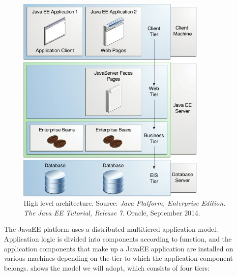 \begin{figure}%
	\centering%
	\includegraphics[width=0.83\textwidth]{img/JEETT}%
	\caption{High level architecture. Source: \emph{Java Platform, Enterprise Edition. The Java EE Tutorial, Release 7}. Oracle, September 2014.}\label{fig:jeett}%
\end{figure}

The JavaEE platform uses a distributed multitiered application model. Application logic is divided into components according to function, and the application components that make up a JavaEE application are installed on various machines depending on the tier to which the application component belongs.  shows the model we will adopt, which consists of four tiers:

